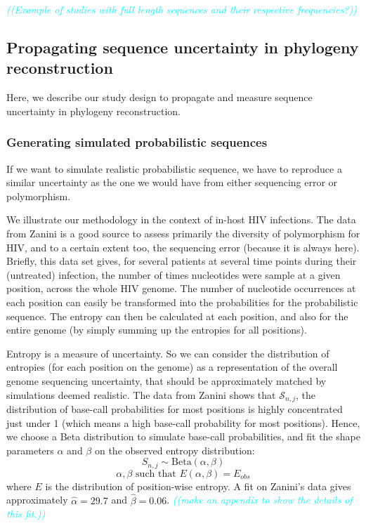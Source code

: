 \documentclass[10pt]{article}
\newcommand{\comment}[1]{\textsl{\textcolor{cyan}{((#1))}}}
\newcommand{\betadist}[1]{\mathrm{Beta}\left(#1\right)}
\newcommand{\nps}{\mathcal{S}} %
\begin{document}
\comment{Example of studies with full length sequences and their respective frequencies?}


\subsection{Propagating sequence uncertainty in phylogeny reconstruction}

Here, we describe our study design to propagate and measure sequence uncertainty in phylogeny reconstruction. 


\subsubsection{Generating simulated probabilistic sequences} 

If we want to simulate realistic probabilistic sequence, we have to reproduce a similar uncertainty as the one we would have from either sequencing error or polymorphism. 

We illustrate our methodology in the context of in-host HIV infections. 
The data from Zanini \cite{Zanini:2015} is a good source to assess primarily the diversity of polymorphism for HIV, and to a certain extent too, the sequencing error (because it is always here). 
Briefly, this data set gives, for several patients at several time points during their (untreated) infection, the number of times nucleotides were sample at a given position, across the whole HIV genome. 
The number of nucleotide occurrences at each position can easily be transformed into the probabilities for the probabilistic sequence. The entropy can then be calculated at each position, and also for the entire genome (by simply summing up the entropies for all positions). 

Entropy is a measure of uncertainty. So we can consider the distribution of entropies (for each position on the genome) as a representation of the overall genome sequencing uncertainty, that should be approximately matched by simulations deemed realistic. 
The data from Zanini shows that $\nps_{n,j}$, the distribution of base-call probabilities for most positions is highly concentrated just under 1 (which means a high base-call probability for most positions). 
Hence, we choose a Beta distribution to simulate base-call probabilities, and fit the shape parameters $\alpha$ and $\beta$ on the observed entropy distribution:
\begin{equation}
\label{eq:beta_sampling}
S_{n,j} \sim \betadist{\alpha, \beta}
\end{equation}
\begin{equation}
\alpha, \beta \text{ such that } E(\alpha,\beta) = E_{obs}
\end{equation}
where $E$ is the distribution of position-wise entropy.
A fit on Zanini's data \cite{Zanini:2015} gives approximately $\hat{\alpha} = 29.7$ and $\hat{\beta} = 0.06$. \comment{make an appendix to show the details of this fit.}
\end{document}
